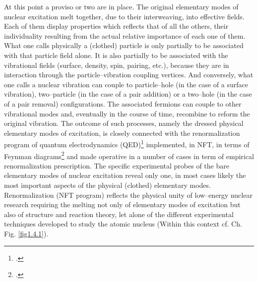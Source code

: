 At this point a proviso or two are in place. The original elementary modes of nuclear excitation melt together, due to their interweaving, into effective fields. Each of them display properties which reflects that of all the others, their individuality resulting from the actual relative importance of each one of them. What one calls physically a (clothed) particle is only partially to be associated with that particle field alone. It is also partially to be associated with the  vibrational fields (surface, density, spin, pairing, etc.), because they are in interaction through the particle--vibration coupling vertices. And conversely, what one calls a nuclear vibration can couple to  particle--hole (in the case of a surface vibration),  two--particle (in the case of a pair addition) or a two--hole (in the case of a pair removal)  configurations. The associated fermions  can   couple to other vibrational modes and, eventually   in the course of time, recombine to reform the original vibration. The outcome of such processes, namely the dressed physical elementary modes of excitation, is closely connected with the renormalization program of quantum electrodynamics (QED)\footnote{\cite{Schwinger:01}.} implemented, in NFT, in terms of Feynman diagrams\footnote{\cite{Feynman:75}.} and made operative in a number of cases in term of empirical renormalization prescription\footnotemark[\ref{foot1}]. The specific experimental probes of the bare elementary modes of nuclear excitation reveal only one, in most cases likely the most important aspects of the physical (clothed) elementary modes. Renormalization (NFT program) reflects the physical unity of  low--energy nuclear research requiring the melting not only of elementary modes of excitation but also of structure and reaction theory, let alone of the different experimental techniques developed to study the atomic nucleus (Within this context cf. Ch.  Fig. \ref{fig1.4.1}). 


